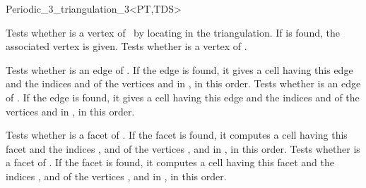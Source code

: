 \begin{ccRefClass}{Periodic_3_triangulation_3<PT,TDS>}

{Tests whether  is a vertex of \ccVar\ by locating  in
the triangulation. If  is found, the associated vertex 
is given.}
\ccGlue
{}
{Tests whether  is a vertex of \ccVar.}

{Tests whether  is an edge of \ccVar. If the edge is found,
it gives a cell  having this edge and the indices 
and  of the vertices  and  in , in this order.  
}
\ccGlue
{}
{Tests whether  is an edge of
  \ccVar. If the edge is found, it gives a cell  having this
  edge and the indices  and  of the vertices  and
   in , in this order. 
}

{Tests whether  is a facet of \ccVar. If the facet is found,
it computes a cell  having this facet and the indices ,
 and  of the vertices ,  and  in , 
in this order.  
}
\ccGlue
{}
{Tests whether 
is a facet of \ccVar. If the facet is found,
it computes a cell  having this facet and the indices ,
 and  of the vertices ,  and  in , 
in this order.  
}


\end{ccRefClass}
